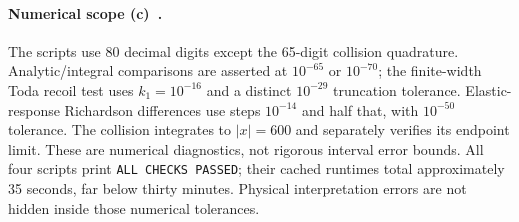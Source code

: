\documentclass[11pt,a4paper]{article}
\newcommand{\C}{\textbf{(c)}\ }
\begin{document}
\paragraph{Numerical scope \C.}
The scripts use 80 decimal digits except the 65-digit collision quadrature.
Analytic/integral comparisons are asserted at $10^{-65}$ or $10^{-70}$;
the finite-width Toda recoil test uses $k_1=10^{-16}$ and a distinct
$10^{-29}$ truncation tolerance. Elastic-response Richardson differences
use steps $10^{-14}$ and half that, with $10^{-50}$ tolerance.
The collision integrates to $|x|=600$ and separately verifies its endpoint
limit. These are numerical diagnostics, not rigorous interval error bounds.
All four scripts print \texttt{ALL CHECKS PASSED}; their cached runtimes
total approximately 35 seconds, far below thirty minutes. Physical interpretation
errors are not hidden inside those numerical tolerances.
\end{document}
